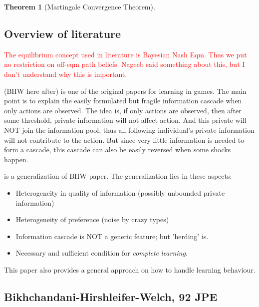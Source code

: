 \documentclass{book}
\theoremstyle{plain}
\newtheorem{thm}{Theorem}[section] %
\theoremstyle{definition}
\begin{document}
\begin{thm}[Martingale Convergence Theorem]

\end{thm}




\subsection{Overview of literature} %
\label{sub:overview_of_literature}


\textcolor{red}{The equilibrium concept used in literature is Bayesian Nash Eqm. Thus we put no restriction on off-eqm path beliefs. Nageeb said something about this, but I don't understand why this is important.}

\cite{Bikhchandani:1992fs} (BHW here after) is one of the original papers for learning in games. The main point is to explain the easily formulated but fragile information cascade when only actions are observed. The idea is, if only actions are observed, then after some threshold, private information will not affect action. And this private will NOT join the information pool, thus all following individual's private information will not contribute to the action. But since very little information is needed to form a cascade, this cascade can also be easily reversed when some shocks happen.


\cite{Smith:2000tz} is a generalization of BHW paper. The generalization lies in these aspects:
\begin{itemize}
	\setlength{\itemsep}{0pt}
	\item Heterogeneity in quality of information (possibly unbounded private information)
	\item Heterogeneity of preference (noise by crazy types)
	\item Information cascade is NOT a generic feature; but 'herding' is.
	\item Necessary and sufficient condition for \textit{complete learning}.
\end{itemize}
This paper also provides a general approach on how to handle learning behaviour.

\subsection{Bikhchandani-Hirshleifer-Welch, 92 JPE} %
\label{subsec:bikhchandani_hirshleifer_welch_92_jpe}
\end{document}
